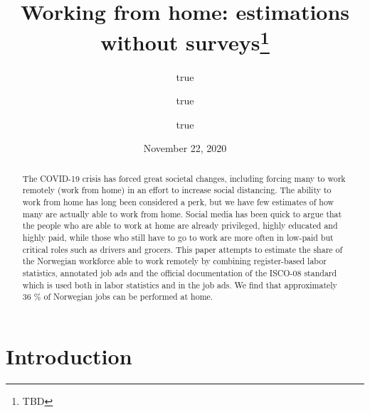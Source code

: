 \documentclass[11pt,]{article}
\title{Working from home: estimations without surveys\thanks{TBD}}
\author{true \and true \and true}
\date{November 22, 2020}
\begin{document}
\maketitle
\begin{abstract}
The COVID-19 crisis has forced great societal changes, including forcing
many to work remotely (work from home) in an effort to increase social
distancing. The ability to work from home has long been considered a
perk, but we have few estimates of how many are actually able to work
from home. Social media has been quick to argue that the people who are
able to work at home are already privileged, highly educated and highly
paid, while those who still have to go to work are more often in
low-paid but critical roles such as drivers and grocers. This paper
attempts to estimate the share of the Norwegian workforce able to work
remotely by combining register-based labor statistics, annotated job ads
and the official documentation of the ISCO-08 standard which is used
both in labor statistics and in the job ads. We find that approximately
36 \% of Norwegian jobs can be performed at home.
\end{abstract}

\hypertarget{introduction}{%
\section{Introduction}\label{introduction}}
\end{document}
